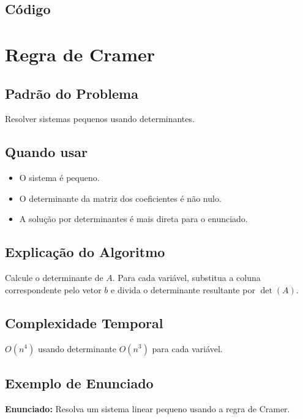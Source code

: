 \subsection{Código}

\section{Regra de Cramer}

\subsection{Padrão do Problema}
Resolver sistemas pequenos usando determinantes.

\subsection{Quando usar}
\begin{itemize}[nosep]
  \item O sistema é pequeno.
  \item O determinante da matriz dos coeficientes é não nulo.
  \item A solução por determinantes é mais direta para o enunciado.
\end{itemize}

\subsection{Explicação do Algoritmo}
Calcule o determinante de $A$. Para cada variável, substitua a coluna correspondente pelo vetor $b$ e divida o determinante resultante por $\det(A)$.

\subsection{Complexidade Temporal}
$O(n^4)$ usando determinante $O(n^3)$ para cada variável.

\subsection{Exemplo de Enunciado}
\begin{exemplodiabox}
\textbf{Enunciado:} Resolva um sistema linear pequeno usando a regra de Cramer.
\end{exemplodiabox}

